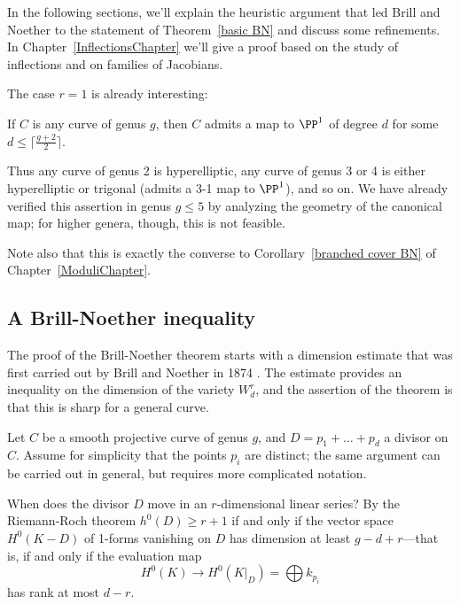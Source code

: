In the following sections, we'll explain the heuristic argument that led Brill and Noether to the statement of Theorem~\ref{basic BN} and discuss some refinements.   In Chapter~\ref{InflectionsChapter} we'll give a proof based on the study
of inflections and on families of Jacobians.%

The case $r=1$ is already interesting:

\begin{corollary}
If $C$ is any curve of genus $g$, then $C$ admits a map  to $\PP^1$ of degree $d$ for some $d \leq \lceil \frac{g+2}{2}\rceil$.
\end{corollary}

Thus any curve of genus 2 is hyperelliptic, any curve of genus 3 or 4 is either hyperelliptic or trigonal  (admits a 3-1 map to $\PP^1$), and so on. We have already verified this assertion in genus $g \leq 5$ by analyzing the geometry of the canonical map; for higher genera, though, this is not feasible.

Note also that this is exactly the converse to Corollary~\ref{branched cover BN} of Chapter~\ref{ModuliChapter}.


\subsection{A Brill-Noether inequality}\label{BN by divisors}

The proof of the Brill-Noether theorem starts with a dimension estimate that was first carried out by Brill and Noether in 1874 \cite{Brill-NoetherOriginal}. The estimate provides an inequality on the dimension
of the variety $W^r_d$, and the assertion of the theorem is that this is sharp for a general curve.


Let $C$ be a smooth projective curve of genus $g$, and $D = p_1 + \dots + p_d$ a divisor on $C$. Assume for simplicity that  the points $p_i$ are distinct; the same argument  can be carried out in general, but requires more complicated notation.

When does the divisor $D$ move in an $r$-dimensional linear series? By the Riemann-Roch theorem $h^0(D) \geq r+1$ if and only if the vector space $H^0(K-D)$ of 1-forms vanishing on $D$ has dimension at least $g-d+r$---that is, if and only if the  evaluation map
$$
H^0(K) \to H^0(K|_D) = \bigoplus k_{p_i}
$$
has rank at most $d-r$. 

